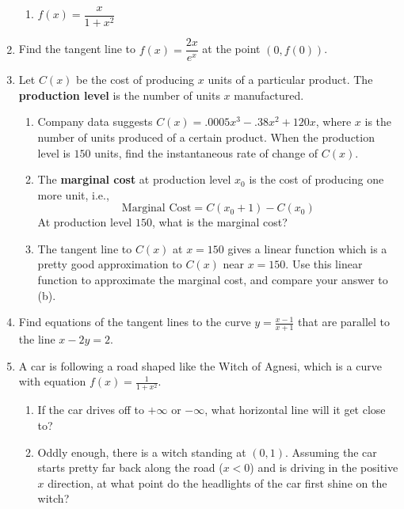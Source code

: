 \documentclass[11pt]{article}
\begin{document}
\begin{enumerate}
\begin{enumerate}
\item $f(x)=\dfrac{x}{1+x^2}$

\vspace{10 pt}

\end{enumerate}

\item Find the tangent line to $f(x)=\dfrac{2x}{e^x}$ at the point $(0,f(0))$.

\vspace{20 pt}

\item Let $C(x)$ be the cost of producing $x$ units of a particular product. The \textbf{production level} is the number of units $x$ manufactured.
\begin{enumerate}
	\item Company data suggests $C(x)=.0005x^3-.38x^2+120x$, where $x$ is the number of units produced of a certain product.  When the production level is $150$ units, find the instantaneous rate of change of $C(x)$.
	
	\vspace{20 pt}
	
	\item The \textbf{marginal cost} at production level $x_0$ is the cost of producing one more unit, i.e.,
	\[
	\mbox{Marginal Cost}=C(x_0+1)-C(x_0)
	\]
	At production level $150$, what is the marginal cost?
	
	\vspace{20 pt}
	
	\item The tangent line to $C(x)$ at $x=150$ gives a linear function which is a pretty good approximation to $C(x)$ near $x=150$.  Use this linear function to approximate the marginal cost, and compare your answer to (b).
	
	\vspace{20 pt}
	
\end{enumerate}

\item Find equations of the tangent lines to the curve $y=\displaystyle\frac{x-1}{x+1}$ that are parallel to the line $x-2y=2$.

\vspace{20 pt}

\item A car is following a road shaped like the Witch of Agnesi, which is a curve with equation $f(x)=\frac{1}{1+x^2}$.
\begin{enumerate}
\item If the car drives off to $+\infty$ or $-\infty$, what horizontal line will it get close to?

\vspace{10 pt}

\item Oddly enough, there is a witch standing at $(0,1)$.  Assuming the car starts pretty far back along the road ($x<0$) and is driving in the positive $x$ direction, at what point do the headlights of the car first shine on the witch?
\end{enumerate}

\end{enumerate}
\end{document}
